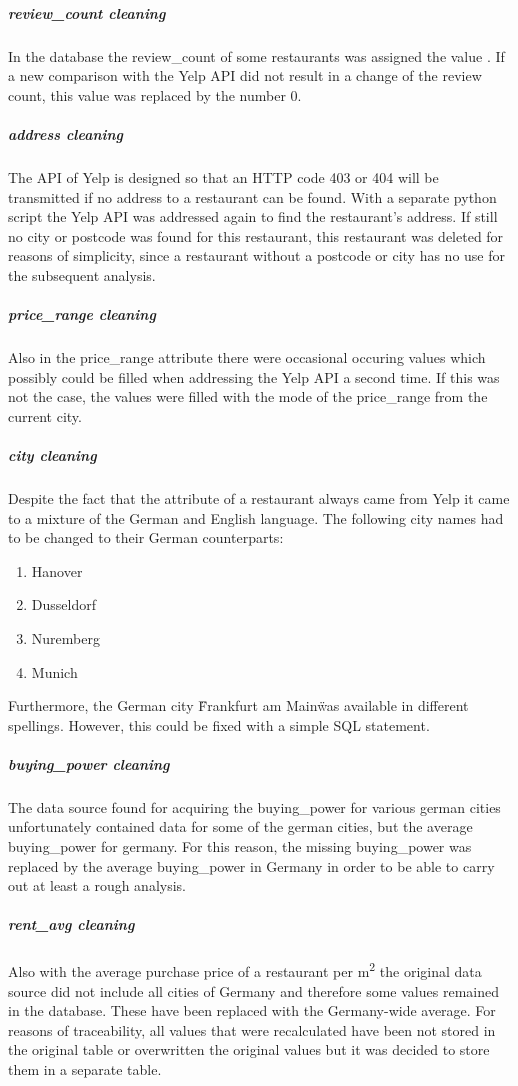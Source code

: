 \subparagraph{review\_count cleaning}
In the \pg{} database the review\_count of some restaurants was assigned the value .
If a new comparison with the Yelp \ac{API} did not result in a change of the review count,
this  value was replaced by the number 0.
\subparagraph{address cleaning}
The \ac{API} of Yelp is designed so that an HTTP code 403 or 404 will be transmitted if no address to a restaurant
can be found.
With a separate python script the Yelp \ac{API} was addressed again to find the restaurant's address.
If still no city or postcode was found for this restaurant, this restaurant was deleted for reasons of simplicity,
since a restaurant without a postcode or city has no use for the subsequent analysis.
\subparagraph{price\_range cleaning}
Also in the price\_range attribute there were occasional occuring  values which possibly could be filled when addressing the Yelp \ac{API} a second time.
If this was not the case, the  values were filled with the mode of the price\_range from the current city.
\subparagraph{city cleaning}
Despite the fact that the  attribute of a restaurant always came from Yelp it came to a mixture of the German and English language.
The following city names had to be changed to their German counterparts:
\begin{enumerate}
  \item Hanover
  \item Dusseldorf
  \item Nuremberg
  \item Munich
\end{enumerate}
Furthermore, the German city \"Frankfurt am Main\" was available in different spellings.
However, this could be fixed with a simple \ac{SQL} statement.
\subparagraph{buying\_power cleaning}
The data source found for acquiring the buying\_power for various german cities unfortunately contained data for some of the german cities,
but the average buying\_power for germany.
For this reason, the missing buying\_power was replaced by the average buying\_power in Germany in order to be able to carry out at least a rough analysis.
\subparagraph{rent\_avg cleaning}
Also with the average purchase price of a restaurant per m\textsuperscript{2} the original data source did not include all cities of Germany and therefore
some  values remained in the database.
These have been replaced with the Germany-wide average.
\newline
For reasons of traceability, all values that were recalculated have been
not stored in the original table or overwritten the original values
but it was decided to store them in a separate table.
